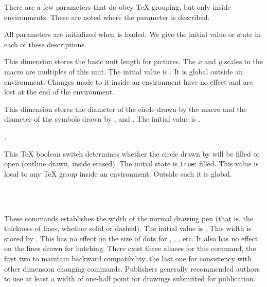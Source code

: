\documentclass[letterpaper]{article}
\begin{document}
There are a few parameters that do obey \TeX{} grouping, but only inside
 environments. These are noted where the parameter is
described.

All parameters are initialized when  is loaded. We give the
initial value or state in each of these descriptions.

\begin{cd}
%
\end{cd}

This dimension stores the basic unit length for \mfp{} pictures. The $x$
and $y$ scales in the  macro are multiples of this unit. The
initial value is \dim{1pt}. It is global outside an 
environment. Changes made to it inside an  environment have
no effect and are lost at the end of the environment.

\begin{cd}
%
\end{cd}

This dimension stores the diameter of the circle drawn by the
 macro and the diameter of the symbols drawn by ,
 and . The initial value is \dim{2pt}.

\begin{cd}
, %
%
\end{cd}

This \TeX{} boolean switch determines whether the circle drawn by
 will be filled or open (outline drawn, inside erased).
The initial state is \texttt{true}: filled. This value is local to any \TeX{}
group inside an  environment. Outside such it is global.

\begin{cd}
\\
\\
%
%
%
\end{cd}

These commands establishes the width of the normal drawing pen (that is,
the thickness of lines, whether solid or dashed). The initial value is
\dim{0.5bp}. This width is stored by \MF{}. This has no effect on the
size of dots for , , , etc. It also has no
effect on the lines drawn for hatching. There exist three aliases for
this command, the first two to maintain backward compatibility, the last
one for consistency with other dimension changing commands. Publishers
generally recommended authors to use at least a width of one-half point
for drawings submitted for publication.
\end{document}
